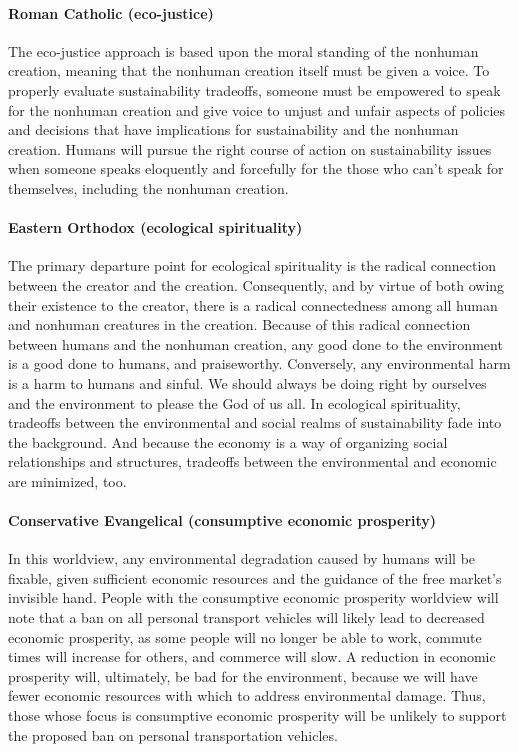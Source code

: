 \documentclass[12pt]{article}
\begin{document}
\paragraph{Roman Catholic (eco-justice)} 

The eco-justice approach is based upon the moral standing of the nonhuman creation,
meaning that the nonhuman creation itself must be given a voice. 
To properly evaluate sustainability tradeoffs,
someone must be empowered to speak for the nonhuman creation and 
give voice to unjust and unfair aspects of policies and decisions
that have implications for sustainability and the nonhuman creation.
Humans will pursue the right course of action on sustainability issues
when someone speaks eloquently and forcefully for the 
those who can't speak for themselves, including the nonhuman creation. 

\paragraph{Eastern Orthodox (ecological spirituality)} 

The primary departure point for ecological spirituality is the radical connection between 
the creator and the creation.
Consequently, and by virtue of both owing their existence to the creator, 
there is a radical connectedness among all human and nonhuman creatures in the creation.
Because of this radical connection between humans and the nonhuman creation, 
any good done to the environment is a good done to humans, 
and praiseworthy. 
Conversely, any environmental harm is a harm to humans and sinful. 
We should always be doing right by ourselves and the environment 
to please the God of us all.
In ecological spirituality, 
tradeoffs between the environmental and social realms of sustainability
fade into the background.
And because the economy is a way of organizing social relationships and structures,
tradeoffs between the environmental and economic are minimized, too.

\paragraph{Conservative Evangelical (consumptive economic prosperity)} 

In this worldview, 
any environmental degradation caused by humans will be fixable,
given sufficient economic resources and the guidance of the free market's invisible hand.
People with the consumptive economic prosperity worldview
will note that a ban on all personal transport vehicles 
will likely lead to decreased economic prosperity,
as some people will no longer be able to work,
commute times will increase for others, and 
commerce will slow. 
A reduction in economic prosperity will, ultimately, be bad for the environment, because
we will have fewer economic resources with which to address environmental damage.
Thus, those whose focus is consumptive economic prosperity will 
be unlikely to support the proposed ban on personal transportation vehicles.
\end{document}
